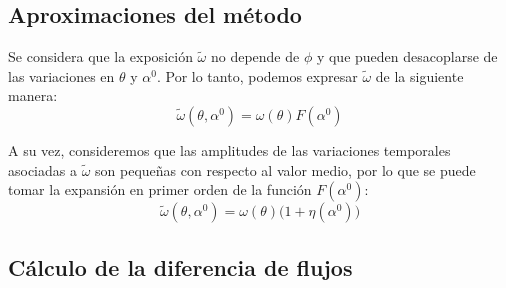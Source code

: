     \subsection{Aproximaciones del método}
    Se considera que la exposición $\tilde{\omega}$ no depende de $\phi$ y que pueden  desacoplarse de las variaciones en $\theta$ y $\alpha^0$. Por lo tanto, podemos expresar $\tilde{\omega}$ de la siguiente manera:
    \begin{equation}
        \tilde{\omega}(\theta, \alpha^0) = \omega(\theta)F(\alpha^0)
    \end{equation}    
    
    A su vez, consideremos que las amplitudes de las variaciones temporales asociadas a $\tilde{\omega}$ son pequeñas con respecto al valor medio, por lo que se puede tomar la expansión en primer orden de la función $F(\alpha^0)$:
    \begin{equation}
        \tilde{\omega}(\theta, \alpha^0) = \omega(\theta)\big(1 + \eta(\alpha^0) \big)
        \label{eq:omega_expandido}
    \end{equation}
    \subsection{Cálculo de la diferencia de flujos}
  
